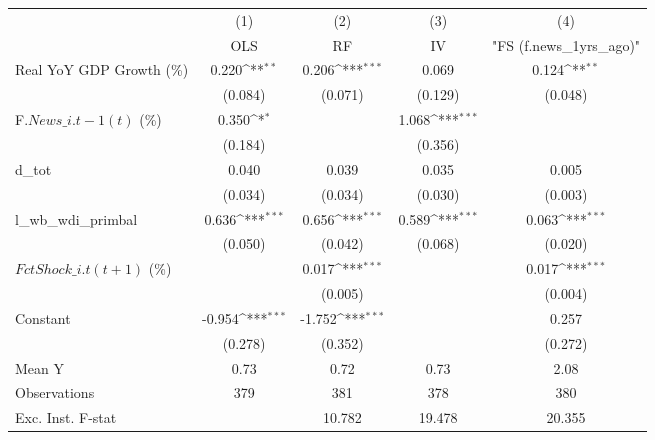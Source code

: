 {
\def\sym#1{\ifmmode^{#1}\else\(^{#1}\)\fi}
\begin{tabular}{l*{4}{c}}
\toprule
                    &\multicolumn{1}{c}{(1)}&\multicolumn{1}{c}{(2)}&\multicolumn{1}{c}{(3)}&\multicolumn{1}{c}{(4)}\\
                    &\multicolumn{1}{c}{OLS}&\multicolumn{1}{c}{RF}&\multicolumn{1}{c}{IV}&\multicolumn{1}{c}{ "FS (f.news\_1yrs\_ago)" }\\
\midrule
Real YoY GDP Growth (\%)&       0.220\sym{**} &       0.206\sym{***}&       0.069         &       0.124\sym{**} \\
                    &     (0.084)         &     (0.071)         &     (0.129)         &     (0.048)         \\
\addlinespace
F.$ News\_{i.t-1}(t)$ (\%)&       0.350\sym{*}  &                     &       1.068\sym{***}&                     \\
                    &     (0.184)         &                     &     (0.356)         &                     \\
\addlinespace
d\_tot               &       0.040         &       0.039         &       0.035         &       0.005         \\
                    &     (0.034)         &     (0.034)         &     (0.030)         &     (0.003)         \\
\addlinespace
l\_wb\_wdi\_primbal    &       0.636\sym{***}&       0.656\sym{***}&       0.589\sym{***}&       0.063\sym{***}\\
                    &     (0.050)         &     (0.042)         &     (0.068)         &     (0.020)         \\
\addlinespace
$ FctShock\_{i.t}(t+1)$ (\%)&                     &       0.017\sym{***}&                     &       0.017\sym{***}\\
                    &                     &     (0.005)         &                     &     (0.004)         \\
\addlinespace
Constant            &      -0.954\sym{***}&      -1.752\sym{***}&                     &       0.257         \\
                    &     (0.278)         &     (0.352)         &                     &     (0.272)         \\
\midrule
Mean Y              &        0.73         &        0.72         &        0.73         &        2.08         \\
Observations        &         379         &         381         &         378         &         380         \\
Exc. Inst. F-stat   &                     &      10.782         &      19.478         &      20.355         \\
\bottomrule
\end{tabular}
}
